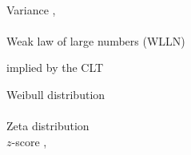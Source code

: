 \documentclass[12pt]{article}
\begin{document}
\\
\noindent Variance \pageref{variance}, \pageref{variancecomputation}\\

\\
\noindent Weak law of large numbers (WLLN) \pageref{wlln}

\quad implied by the CLT \pageref{cltimplieswlln}

\noindent Weibull distribution \pageref{weibulldist}\\

\\
\noindent Zeta distribution \pageref{zetadist}\\
\noindent $z$-score \pageref{d:z-score}, \pageref{zscore2}\\
\end{document}
